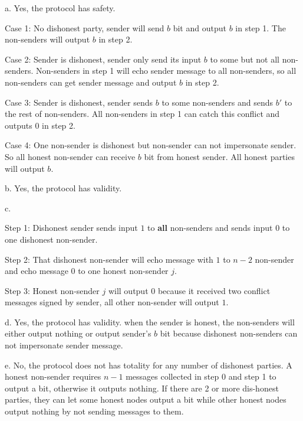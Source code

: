 \documentclass{article}
\begin{document}
a. Yes, the protocol has safety. 

Case 1: No dishonest party, sender will send $b$ bit and output $b$ in step 1. The non-senders will output $b$ in step 2.

Case 2: Sender is dishonest, sender only send its input $b$ to some but not all non-senders. Non-senders in step 1 will echo sender message to all non-senders, so all non-senders can get sender message and output $b$ in step 2.

Case 3: Sender is dishonest, sender sends $b$ to some non-senders and sends $b'$ to the rest of non-senders. All non-senders in step 1 can catch this conflict and outputs $0$ in step 2.

Case 4: One non-sender is dishonest but non-sender can not impersonate sender. So all honest non-sender can receive $b$ bit from honest sender. All honest parties will output $b$.


\vspace{12pt}

b. Yes, the protocol has validity. 

\vspace{12pt}

c. 

Step 1: Dishonest sender sends input $1$ to \textbf{all} non-senders and sends input $0$ to one dishonest non-sender.

Step 2: That dishonest non-sender will echo message with $1$ to $n-2$ non-sender and echo message $0$ to one honest non-sender $j$.

Step 3: Honest non-sender $j$ will output $0$ because it received two conflict messages signed by sender, all other non-sender will output $1$.


\vspace{12pt}

d. Yes, the protocol has validity. when the sender is honest, the non-senders will either output nothing or output sender's $b$ bit because dishonest non-senders can not impersonate sender message.

\vspace{12pt}

e. No, the protocol does not has totality for any number of dishonest parties. A honest non-sender requires $n-1$ messages collected in step 0 and step 1 to output a bit, otherwise it outputs nothing. If there are 2 or more dis-honest parties, they can let some honest nodes output a bit while other honest nodes output nothing by not sending messages to them.
\end{document}
